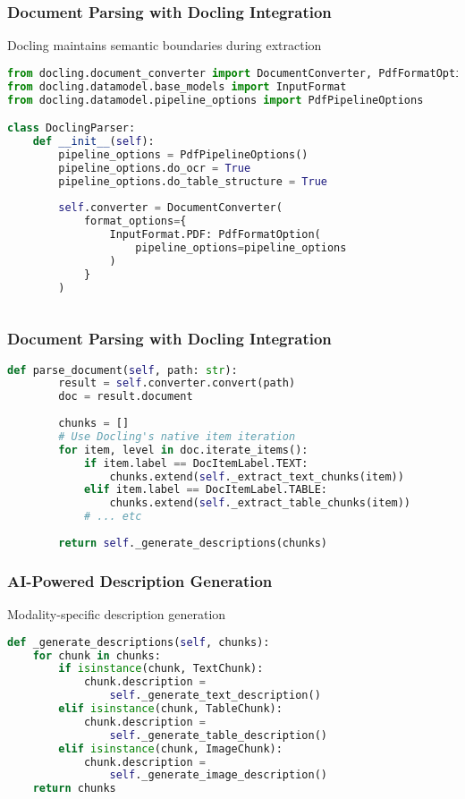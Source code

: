 \begin{frame}[fragile]\frametitle{Document Parsing with Docling Integration}
Docling maintains semantic boundaries during extraction

\begin{lstlisting}[language=Python, basicstyle=\tiny]
from docling.document_converter import DocumentConverter, PdfFormatOption
from docling.datamodel.base_models import InputFormat
from docling.datamodel.pipeline_options import PdfPipelineOptions

class DoclingParser:
    def __init__(self):
        pipeline_options = PdfPipelineOptions()
        pipeline_options.do_ocr = True
        pipeline_options.do_table_structure = True
        
        self.converter = DocumentConverter(
            format_options={
                InputFormat.PDF: PdfFormatOption(
                    pipeline_options=pipeline_options
                )
            }
        )
    
\end{lstlisting}
\end{frame}

\begin{frame}[fragile]\frametitle{Document Parsing with Docling Integration}
\begin{lstlisting}[language=Python, basicstyle=\tiny]
    def parse_document(self, path: str):
        result = self.converter.convert(path)
        doc = result.document
        
        chunks = []
        # Use Docling's native item iteration
        for item, level in doc.iterate_items():
            if item.label == DocItemLabel.TEXT:
                chunks.extend(self._extract_text_chunks(item))
            elif item.label == DocItemLabel.TABLE:
                chunks.extend(self._extract_table_chunks(item))
            # ... etc
        
        return self._generate_descriptions(chunks)
\end{lstlisting}
\end{frame}


\begin{frame}[fragile]\frametitle{AI-Powered Description Generation}

Modality-specific description generation

\begin{lstlisting}[language=Python, basicstyle=\tiny]
def _generate_descriptions(self, chunks):
    for chunk in chunks:
        if isinstance(chunk, TextChunk):
            chunk.description = 
                self._generate_text_description()
        elif isinstance(chunk, TableChunk):
            chunk.description = 
                self._generate_table_description()
        elif isinstance(chunk, ImageChunk):
            chunk.description = 
                self._generate_image_description()
    return chunks
\end{lstlisting}

\end{frame}

